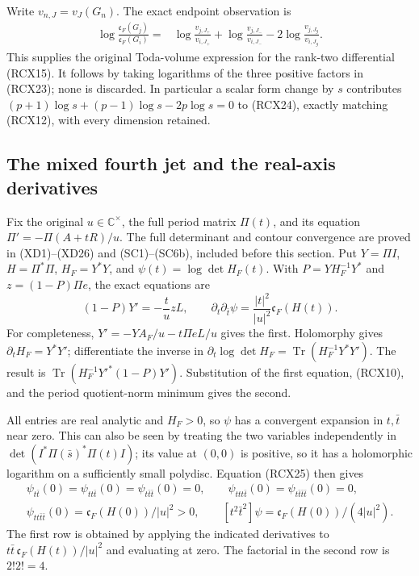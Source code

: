 Write \(v_{n,J}=v_J(G_n)\). The exact endpoint observation is
\[
\begin{split}
 \log\frac{\mathfrak c_F(G_j)}{\mathfrak c_F(G_i)}
  ={}&\log\frac{v_{j,J_+}}{v_{i,J_+}}
     +\log\frac{v_{j,J_-}}{v_{i,J_-}}
     -2\log\frac{v_{j,J_g}}{v_{i,J_g}} .
\end{split}\tag{RCX24}
\]
This supplies the original Toda-volume expression for the
rank-two differential (RCX15). It follows by taking logarithms of
the three positive factors in (RCX23); none is discarded.
In particular a scalar form change by \(s\) contributes
\((p+1)\log s+(p-1)\log s-2p\log s=0\) to (RCX24),
exactly matching (RCX12), with every dimension retained.

\subsection{The mixed fourth jet and the real-axis derivatives}

Fix the original \(u\in\mathbb C^\times\), the full period matrix
\(\Pi(t)\), and its equation \(\Pi'=-\Pi(A+tR)/u\).
The full determinant and contour convergence are proved in
(XD1)--(XD26) and (SC1)--(SC6b), included before this section.
Put \(Y=\Pi I\), \(H=\Pi^*\Pi\), \(H_F=Y^*Y\), and
\(\psi(t)=\log\det H_F(t)\). With
\(P=YH_F^{-1}Y^*\) and \(z=(1-P)\Pi e\), the exact equations are
\[
 (1-P)Y'=-\frac t u zL,\qquad
 \partial_t\partial_{\bar t}\psi
      =\frac{|t|^2}{|u|^2}\mathfrak c_F(H(t)).
 \tag{RCX25}
\]
For completeness, \(Y'=-YA_F/u-t\Pi eL/u\) gives the first.
Holomorphy gives \(\partial_tH_F=Y^*Y'\);
differentiate the inverse in
\(\partial_t\log\det H_F=\operatorname{Tr}(H_F^{-1}Y^*Y')\).
The result is
\(\operatorname{Tr}(H_F^{-1}Y'^*(1-P)Y')\).
Substitution of the first equation, (RCX10), and the period
quotient-norm minimum gives the second.

All entries are real analytic and \(H_F>0\), so \(\psi\) has a
convergent expansion in \(t,\bar t\) near zero. This can also
be seen by treating the two variables independently in
\(\det(I^*\Pi(\bar s)^*\Pi(t)I)\); its value at \((0,0)\)
is positive, so it has a holomorphic logarithm on a sufficiently
small polydisc. Equation (RCX25) then gives
\[
\begin{gathered}
 \psi_{t\bar t}(0)=\psi_{tt\bar t}(0)
  =\psi_{t\bar t\bar t}(0)=0,\qquad
 \psi_{ttt\bar t}(0)=\psi_{t\bar t\bar t\bar t}(0)=0,\\
 \boxed{\psi_{tt\bar t\bar t}(0)
       =\mathfrak c_F(H(0))/|u|^2>0,\qquad
 [t^2\bar t^2]\psi=\mathfrak c_F(H(0))/(4|u|^2).}
\end{gathered}\tag{RCX26}
\]
The first row is obtained by applying the indicated derivatives
to \(t\bar t\,\mathfrak c_F(H(t))/|u|^2\) and evaluating at zero.
The factorial in the second row is \(2!2!=4\).

